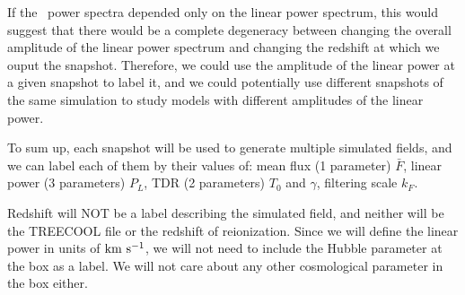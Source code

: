 If the \lya\ power spectra depended only on the linear power spectrum, this 
would suggest that there would be a complete degeneracy between changing 
the overall amplitude of the linear power spectrum and changing the redshift
at which we ouput the snapshot. 
Therefore, we could use the amplitude of the linear power at a given snapshot
to label it, and we could potentially use different snapshots of the same 
simulation to study models with different amplitudes of the linear power. 


To sum up, each snapshot will be used to generate multiple simulated 
fields, and we can label each of them by their values of: 
mean flux (1 parameter) $\bar F$,
linear power (3 parameters) $P_L$,
TDR (2 parameters) $T_0$ and $\gamma$, 
filtering scale $k_F$.

Redshift will NOT be a label describing the simulated field, and neither
will be the TREECOOL file or the redshift of reionization.
Since we will define the linear power in units of ${\rm km~s^{-1}}$, we will not 
need to include the Hubble parameter at the box as a label.
We will not care about any other cosmological parameter in the box
either.
